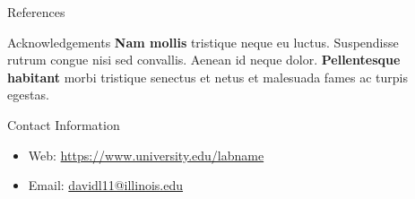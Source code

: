 \documentclass{beamer} %
\begin{document}
\begin{frame}[t]
\begin{columns}[t]
\begin{column}{0.465\textwidth}
\begin{block}{References}
	\nocite{*} %
	\small %
	\vspace{-1ex} %
\end{block}


\begin{block}{Acknowledgements}
	\textbf{Nam mollis} tristique neque eu luctus. Suspendisse rutrum congue nisi sed convallis. Aenean id neque dolor. \textbf{Pellentesque habitant} morbi tristique senectus et netus et malesuada fames ac turpis egestas.
\end{block}



\begin{block}{Contact Information}
	\begin{itemize}
		\item Web: \href{https://www.university.edu/labname}{https://www.university.edu/labname}
		\item Email: \href{mailto:davidl11@illinois.edu}{davidl11@illinois.edu}
	\end{itemize}
\end{block}


\end{column} %

\begin{column}{0.02\textwidth}\end{column} %

\end{columns} %

\end{frame} %

\end{document}
